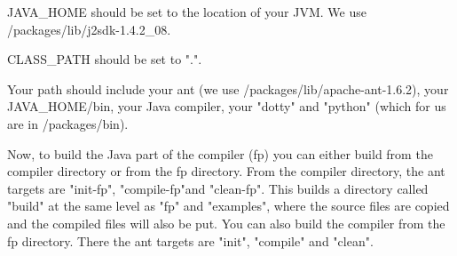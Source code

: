 JAVA\_HOME should be set to the location of your JVM.   We use /packages/lib/j2sdk-1.4.2\_08.

CLASS\_PATH should be set to ".".

Your path should include your ant (we use /packages/lib/apache-ant-1.6.2), your JAVA\_HOME/bin, your Java compiler, your "dotty" and "python" (which for us are in /packages/bin).

Now, to build the Java part of the compiler (fp) you can either build from the compiler directory or from the fp directory.   From the compiler directory, the ant targets are "init-fp", "compile-fp"and "clean-fp".  This builds a directory called "build" at the same level as "fp" and "examples", where the source files are copied and the compiled files will also be put.  You can also build the compiler from the fp directory.  There the ant targets are "init", "compile" and "clean".
 




